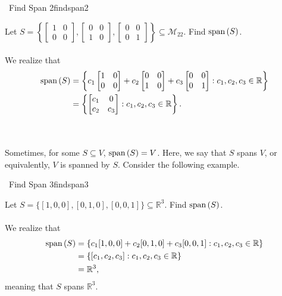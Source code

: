         \begin{example}{\Difficulty\,\Difficulty\,\,Find Span 2}{findspan2}
            
            Let \(S=\left\{\begin{bmatrix} 1 & 0 \\ 0 & 0 \end{bmatrix},\begin{bmatrix} 0 & 0 \\ 1 & 0 \end{bmatrix},\begin{bmatrix} 0 & 0 \\ 0 & 1 \end{bmatrix}\right\}\subseteq \mathcal{M}_{22}\). Find \(\text{span\,}(S)\).
            \\
            \\
            We realize that
            \begin{align*}
                \text{span\,}(S)&=\left\{c_1\begin{bmatrix} 1 & 0 \\ 0 & 0 \end{bmatrix}+c_2\begin{bmatrix} 0 & 0 \\ 1 & 0 \end{bmatrix}+c_3\begin{bmatrix} 0 & 0 \\ 0 & 1 \end{bmatrix}:c_1,c_2,c_3\in\mathbb{R}\right\} \\
                &=\left\{\begin{bmatrix} c_1 & 0 \\ c_2 & c_3 \end{bmatrix}:c_1,c_2,c_3\in\mathbb{R}\right\}.
            \end{align*}

        \end{example}
        \vphantom
        \\
        \\
        Sometimes, for some \(S\subseteq V\), \(\text{span\,}(S)=V\). Here, we say that \(S\) spans \(V\), or equivalently, \(V\) is spanned by \(S\). Consider the following example.
        \begin{example}{\Difficulty\,\Difficulty\,\,Find Span 3}{findspan3}
            
            Let \(S=\{[1,0,0],[0,1,0],[0,0,1]\}\subseteq \mathbb{R}^3\). Find \(\text{span\,}(S)\).
            \\
            \\
            We realize that
            \begin{align*}
                \text{span\,}(S)&=\{c_1[1,0,0]+c_2[0,1,0]+c_3[0,0,1]:c_1,c_2,c_3\in\mathbb{R}\} \\
                &=\{[c_1,c_2,c_3]:c_1,c_2,c_3\in\mathbb{R}\} \\
                &=\mathbb{R}^3,
            \end{align*}
            meaning that \(S\) spans \(\mathbb{R}^3\).

        \end{example}
